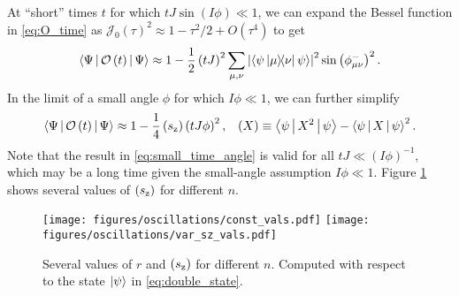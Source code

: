 \documentclass[nofootinbib,notitlepage,11pt]{revtex4-2}
\newcommand{\f}[2]{\dfrac{#1}{#2}} %
\newcommand{\p}[1]{\left(#1\right)} %
\newcommand{\bk}{\Braket} %
\newcommand{\1}{\mathds{1}}
\newcommand{\z}{\text{z}}
\newcommand{\J}{\mathcal{J}}
\renewcommand{\O}{\mathcal{O}}
\let\var\relax
\DeclareMathOperator{\var}{var}
\begin{document}
At ``short'' times $t$ for which $tJ\sin\p{I\phi}\ll1$, we can expand
the Bessel function in \eqref{eq:O_time} as
$\J_0\p{\tau}^2\approx1-\tau^2/2+O\p{\tau^4}$ to get
\begin{align}
  \bk{\Psi|\O\p{t}|\Psi}
  \approx 1 - \f12 \p{tJ}^2 \sum_{\mu,\nu}
  \abs{\bk{\psi\op{\mu}{\nu}\psi}}^2 \sin\p{\phi_{\mu\nu}^-}^2.
\end{align}
In the limit of a small angle $\phi$ for which $I\phi\ll1$, we can
further simplify
\begin{align}
  \bk{\Psi|\O\p{t}|\Psi}
  \approx 1 - \f14 \var\p{s_\z} \p{tJ\phi}^2,
  &&
  \var\p{X} \equiv \bk{\psi|X^2|\psi} - \bk{\psi|X|\psi}^2.
  \label{eq:small_time_angle}
\end{align}
Note that the result in \eqref{eq:small_time_angle} is valid for all
$tJ\ll\p{I\phi}^{-1}$, which may be a long time given the small-angle
assumption $I\phi\ll1$.  Figure \ref{fig:limiting_vals} shows several
values of $\var\p{s_\z}$ for different $n$.

\begin{figure}
  \centering
  \texttt{[image: figures/oscillations/const\_vals.pdf]}
  \texttt{[image: figures/oscillations/var\_sz\_vals.pdf]}
  \caption{Several values of $r$ and $\var\p{s_\z}$ for different $n$.
    Computed with respect to the state $\ket\psi$ in
    \eqref{eq:double_state}.}
  \label{fig:limiting_vals}
\end{figure}
\end{document}
